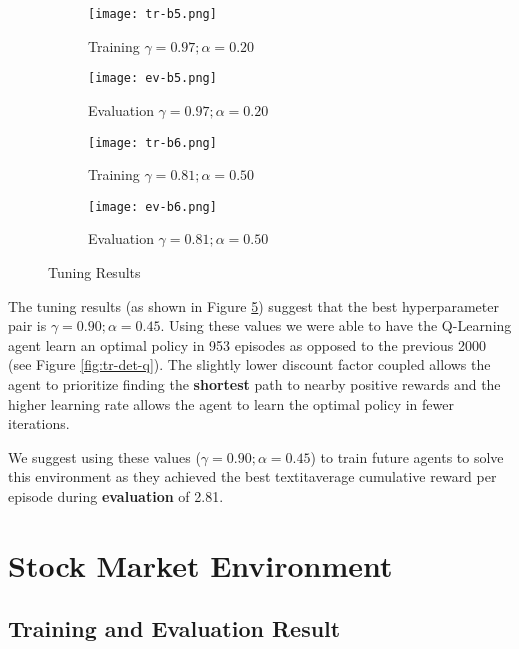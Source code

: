\documentclass{article} %
\begin{document}
\vfill
\begin{figure}[H]
    \begin{subfigure}{.45\textwidth}
        \centering
        \texttt{[image: tr-b5.png]}
        \caption{Training $\gamma=0.97; \alpha=0.20$}
        \label{fig:trial5}
    \end{subfigure}
    \hfill
    \begin{subfigure}{.45\textwidth}
        \centering
        \texttt{[image: ev-b5.png]}
        \caption{Evaluation $\gamma=0.97; \alpha=0.20$}
        \label{fig:ev5}
    \end{subfigure}

    \begin{subfigure}{.45\textwidth}
        \centering
        \texttt{[image: tr-b6.png]}
        \caption{Training $\gamma=0.81; \alpha=0.50$}
        \label{fig:trial6}
    \end{subfigure}
    \hfill
    \begin{subfigure}{.45\textwidth}
        \centering
        \texttt{[image: ev-b6.png]}
        \caption{Evaluation $\gamma=0.81; \alpha=0.50$}
        \label{fig:ev6}
    \end{subfigure}
    \caption{Tuning Results}
    \label{fig:tuning-res}
\end{figure}

The tuning results (as shown in Figure \ref{fig:tuning-res}) suggest that the best
hyperparameter pair is $\gamma=0.90; \alpha=0.45$. Using these values we were able to have
the Q-Learning agent learn an optimal policy in 953 episodes as opposed to the previous
2000 (see Figure \ref{fig:tr-det-q}). The slightly lower discount factor coupled allows the
agent to prioritize finding the \textbf{shortest} path to nearby positive rewards and the
higher learning rate allows the agent to learn the optimal policy in fewer iterations.

We suggest using these values ($\gamma=0.90; \alpha=0.45$) to train future agents to solve
this environment as they achieved the best textit{average cumulative reward per episode}
during \textbf{evaluation} of 2.81.

\section{Stock Market Environment}
\subsection{Training and Evaluation Result}
\end{document}
